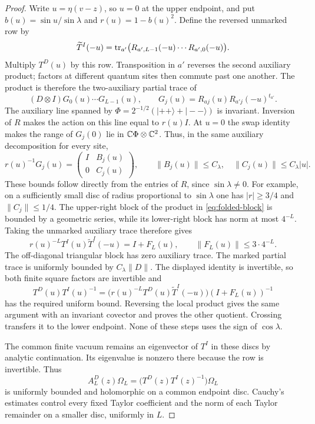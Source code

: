\begin{proof}
Write $u=\eta(v-z)$, so $u=0$ at the upper endpoint, and put
$b(u)=\sin u/\sin\lambda$ and $r(u)=1-b(u)^2$. Define the
reversed unmarked row by
\[
 \widetilde T^I(-u)
   =\operatorname{tr}_{a'}\bigl(R_{a',L-1}(-u)\cdots R_{a',0}(-u)\bigr).
\]
Multiply $T^D(u)$ by this row. Transposition in $a'$ reverses the
second auxiliary product; factors at different quantum sites then
commute past one another. The product is therefore the two-auxiliary
partial trace of
\[
 (D\otimes I)G_0(u)\cdots G_{L-1}(u),\qquad
 G_j(u)=R_{aj}(u)R_{a'j}(-u)^{t_{a'}}.
\]
The auxiliary line spanned by
$\Phi=2^{-1/2}(|++\rangle+|--\rangle)$ is invariant.  Inversion of
$R$ makes the action on this line equal to $r(u)I$.  At $u=0$ the
swap identity makes the range of $G_j(0)$ lie in
$\mathbb C\Phi\otimes\mathbb C^2$.  Thus, in the same auxiliary decomposition for
every site,
\begin{equation}\label{eq:folded-block}
 r(u)^{-1}G_j(u)=
 \begin{pmatrix}I&B_j(u)\\0&C_j(u)\end{pmatrix},\qquad
 \|B_j(u)\|\le C_\lambda,\quad
 \|C_j(u)\|\le C_\lambda|u|.
\end{equation}
These bounds follow directly from the entries of $R$, since
$\sin\lambda\ne0$.  For example, on a sufficiently small disc of
radius proportional to $\sin\lambda$ one has $|r|\ge3/4$ and
$\|C_j\|\le1/4$.  The upper-right block of the product in
\eqref{eq:folded-block} is bounded by a geometric series, while its
lower-right block has norm at most $4^{-L}$.  Taking the unmarked
auxiliary trace therefore gives
\[
 r(u)^{-L}T^I(u)\widetilde T^I(-u)=I+F_L(u),
 \qquad \|F_L(u)\|\le3\cdot4^{-L}.
\]
The off-diagonal triangular block has zero auxiliary trace.  The marked
partial trace is uniformly bounded by $C_\lambda\|D\|$.  The displayed
identity is invertible, so both finite square factors are invertible and
\[
 T^D(u)T^I(u)^{-1}
 =\bigl(r(u)^{-L}T^D(u)\widetilde T^I(-u)\bigr)(I+F_L(u))^{-1}
\]
has the required uniform bound.  Reversing the local product gives the
same argument with an invariant covector and proves the other quotient.
Crossing transfers it to the lower endpoint.  None of these steps uses
the sign of $\cos\lambda$.

The common finite vacuum remains an eigenvector of $T^I$ in these
discs by analytic continuation. Its eigenvalue is nonzero there because
the row is invertible. Thus
\[
 A_L^D(z)\Omega_L
   =\bigl(T^D(z)T^I(z)^{-1}\bigr)\Omega_L
\]
is uniformly bounded and holomorphic on a common endpoint disc.
Cauchy's estimates control every fixed Taylor coefficient and the norm
of each Taylor remainder on a smaller disc, uniformly in $L$.


\end{proof}
